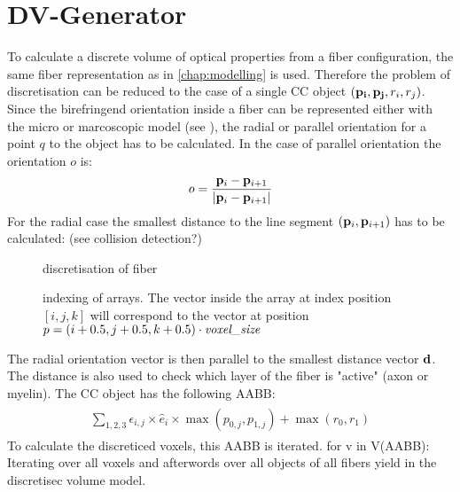 \section{DV-Generator}
\label{sec:dv_generator}
% 
To calculate a discrete volume of optical properties from a fiber configuration, the same fiber representation as in \cref{chap:modelling} is used.
Therefore the problem of discretisation can be reduced to the case of a single \ac{CC} object $(\mathbf{p_i}, \mathbf{p_{j}}, r_i, r_{j})$.
% 
Since the birefringend orientation inside a fiber can be represented either with the micro or marcoscopic model (see \dummy), the radial or parallel orientation for a point $q$ to the object has to be calculated.
In the case of parallel orientation the orientation $o$ is:
\begin{align}
\begin{split}
    o = \frac{\mathbf{p}_i - \mathbf{p}_{i+1}}{\lvert\mathbf{p}_i - \mathbf{p}_{i+1}\rvert}
\end{split}
\end{align}
% 
For the radial case the smallest distance to the line segment $(\mathbf{p}_i,\mathbf{p}_{i+1})$ has to be calculated:
(see collision detection?)
% 
\begin{figure}[!t]
\centering
\def\tikzwidth{0.625\textwidth}
\caption{discretisation of fiber}
\label{fig:fiber_discretisation}
\end{figure}
% 
\begin{figure}[!tb]
\centering
\def\tikzwidth{0.33\textwidth}
\caption{indexing of arrays.
The vector inside the array at index position $[i,j,k]$ will correspond to the vector at position $p=(i+0.5,j+0.5,k+0.5)\cdot \mathit{\textit{voxel\_size}}$}
\label{fig:indexing_array}
\end{figure}
% 
The radial orientation vector is then parallel to the smallest distance vector $\mathbf{d}$.
The distance is also used to check which layer of the fiber is "active" (\eg axon or myelin). 
% 
The \ac{CC} object has the following \ac{AABB}:
\begin{align}
\begin{split}
    \sum_{1,2,3} \epsilon_{i,j} \times \hat{e}_i \times \max(p_{0,j}, p_{1,j}) + \max(r_0, r_1)
\end{split}
\end{align}
To calculate the discreticed voxels, this \ac{AABB} is iterated. for v in V(AABB): \dummy
% 
Iterating over all voxels and afterwords over all objects of all fibers yield in the discretisec volume model.\\
